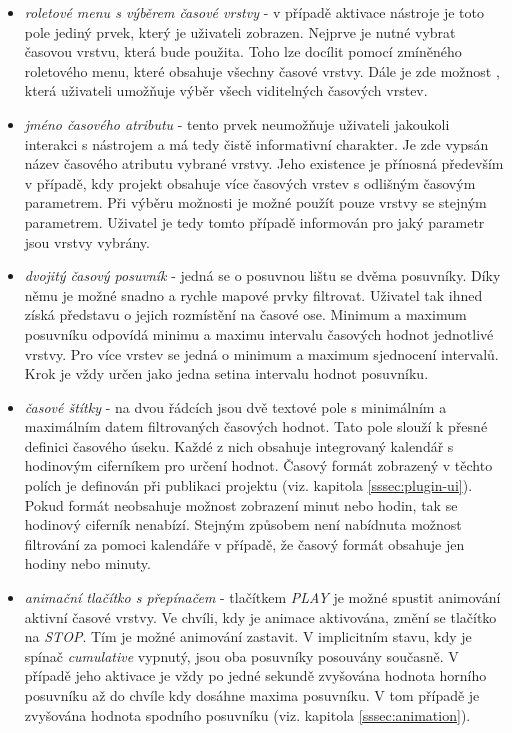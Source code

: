 \begin{itemize}
\item\textit{roletové menu s výběrem časové vrstvy} - v
případě aktivace nástroje je toto pole jediný prvek, který
je uživateli zobrazen. Nejprve je nutné vybrat
časovou vrstvu, která bude použita. Toho lze docílit pomocí
zmíněného roletového menu, které obsahuje všechny časové
vrstvy. Dále je zde možnost , která uživateli
umožňuje výběr všech viditelných časových vrstev.
\item\textit{jméno časového atributu} - tento prvek neumožňuje
uživateli jakoukoli interakci s nástrojem a má tedy čistě
informativní charakter. Je zde vypsán název časového atributu
vybrané vrstvy. Jeho existence je přínosná především v
případě, kdy projekt obsahuje více časových vrstev s odlišným
časovým parametrem. Při výběru možnosti  je
možné použít pouze vrstvy se stejným parametrem. Uživatel je tedy
tomto případě informován pro jaký parametr jsou vrstvy vybrány.
\item\textit{dvojitý časový posuvník} - jedná se o posuvnou lištu
se dvěma
posuvníky. Díky němu je možné snadno a rychle mapové
prvky filtrovat. Uživatel tak ihned získá představu o jejich
rozmístění na časové ose. Minimum a maximum posuvníku odpovídá
minimu a maximu intervalu časových hodnot jednotlivé vrstvy. Pro
více vrstev se jedná o minimum a maximum sjednocení intervalů. Krok
je vždy určen jako jedna setina intervalu hodnot posuvníku.
\item\textit{časové štítky} - na dvou řádcích jsou dvě
textové pole s minimálním a maximálním datem filtrovaných
časových hodnot. Tato pole slouží k přesné definici
časového úseku. Každé z nich obsahuje integrovaný kalendář
s hodinovým ciferníkem pro určení hodnot. Časový formát
zobrazený v těchto polích je definován při publikaci projektu
(viz. kapitola \ref{sssec:plugin-ui}). Pokud formát neobsahuje
možnost zobrazení minut nebo hodin, tak se hodinový
ciferník nenabízí. Stejným způsobem není nabídnuta možnost
filtrování za pomoci kalendáře v případě, že časový formát
obsahuje jen hodiny nebo minuty.
\item\textit{animační tlačítko s přepínačem} - tlačítkem \textit{PLAY}
je možné spustit animování aktivní časové vrstvy.  Ve chvíli, kdy je
animace aktivována, změní se tlačítko na \textit{STOP}. Tím je možné
animování zastavit. V implicitním stavu, kdy je
spínač \textit{cumulative} vypnutý, jsou oba posuvníky posouvány
současně. V případě jeho aktivace je vždy po jedné sekundě zvyšována
hodnota horního posuvníku až do chvíle kdy dosáhne maxima posuvníku. V
tom případě je zvyšována hodnota spodního posuvníku
(viz. kapitola \ref{sssec:animation}).
\end{itemize}

